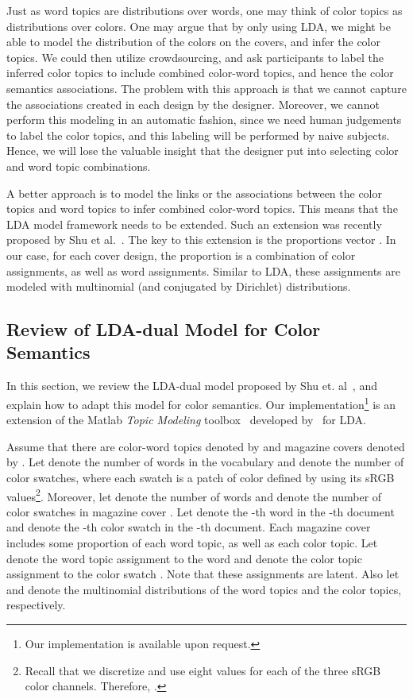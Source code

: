 \documentclass[prodmode,acmtochi]{acmsmall}
\begin{document}
Just as word topics are distributions over words, one may think of color topics as distributions over colors. One may argue that by only using LDA, we might be able to model the distribution of the colors on the covers, and infer the color topics. We could then utilize crowdsourcing, and ask participants to label the inferred color topics to include combined color-word topics, and hence the color semantics associations.
The problem with this approach is that we cannot capture the associations created in each design by the designer. Moreover, we cannot perform this modeling in an automatic fashion, since we need human judgements to label the color topics, and this labeling will be performed by naive subjects.
Hence, we will lose the valuable insight that the designer put into selecting color and word topic combinations.

A better approach is to model the links or the associations between the color topics and word topics to infer combined color-word topics.
This means that the LDA model framework needs to be extended. Such an extension was recently proposed by Shu et al.~\cite{shu2009latent}. The key to this extension is the proportions vector .
In our case, for each cover design, the proportion is a combination of color assignments, as well as word assignments.
Similar to LDA, these assignments are modeled with multinomial (and conjugated by Dirichlet) distributions.


\subsection{Review of LDA-dual Model for Color Semantics}

In this section, we review the LDA-dual model proposed by Shu et. al~\cite{shu2009latent}, and explain how to adapt this model for color semantics.
Our implementation\footnote{Our implementation is available upon request.} is an extension of the Matlab \emph{Topic Modeling} toolbox~\cite{MatlabTopicModelingToolbox} developed by~\cite{griffiths2004finding} for LDA.

Assume that there are  color-word topics denoted by 
and  magazine covers denoted by .  Let 
denote the number of words in the vocabulary and  denote the number
of color swatches, where each swatch is a patch of color defined by
using its sRGB values\footnote{Recall that we discretize and use eight
  values for each of the three sRGB color channels. Therefore, .}.  Moreover, let  denote the number of words and 
denote the number of color swatches in magazine cover . Let
 denote the -th word in the -th document and 
denote the -th color swatch in the -th document.
Each magazine cover includes some proportion of each word topic, as well as each color topic.
Let  denote the word topic assignment to the word  and  denote the color topic assignment to the color swatch . Note that these assignments are latent. Also let  and  denote the multinomial distributions of the word topics and the color topics, respectively.
\end{document}
